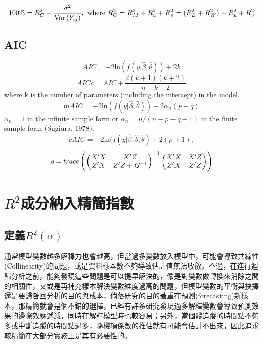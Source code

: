 \begin{equation}\label{eq:r2.composition}
100\%=R_C^2+\frac{\sigma^2}{\text{Var\,}(Y_{ij})}, \text{ where } R_C^2=R_M^2+R_u^2+R_v^2=(R_B^2+R_W^2)+R_u^2+R_v^2
\end{equation}

\subsection{AIC}
\begin{equation}\label{eq:AIC}
AIC = −2\text{ln}(f(y|\hat\beta, \hat\theta))+2k
\end{equation}
\begin{equation}\label{eq:AICc}
AICc = AIC + \frac{2(k+1)(k+2)}{n−k−2}
\end{equation}
where k is the number of parameters (including the intercept) in the model.
\begin{equation}\label{eq:mAIC}
mAIC = −2\text{ln}(f(y|\hat\beta, \hat\theta)) + 2\alpha_n(p+q)
\end{equation}
$\alpha_n = 1$ in the infinite sample form or $\alpha_n = n/(n−p−q−1)$ in the finite sample form (Sugiura, 1978).
\begin{equation}\label{eq:cAIC}
cAIC = −2\text{ln}(f(y|\hat\beta, \hat b, \hat\theta) + 2(\rho + 1),
\end{equation}
\[\rho=trace\left(\begin{pmatrix}X'X&X'Z\\Z'X&Z'Z+G^{-1}\end{pmatrix}^{-1}
\begin{pmatrix}X'X&X'Z\\Z'X&Z'Z\end{pmatrix}\right)\]




\newpage 
\section{$R^2$成分納入精簡指數}
\subsection{定義$R^2(\alpha)$}
通常模型變數越多解釋力也會越高，但當過多變數放入模型中，可能會導致共線性(Collinearity)的問題，或是資料樣本數不夠導致估計值無法收斂。不過，在進行迴歸分析之前，能夠發現這些問題是可以提早解決的，像是對變數做轉換來消除之間的相關性，又或是再補充樣本解決變數維度過高的問題，但模型變數的平衡與抉擇還是要歸咎回分析的目的與成本，倘落研究的目的著重在預測(forecasting)新樣本，那精簡就會是個不錯的選擇，已經有許多研究發現過多解釋變數會導致預測效果的邊際效應遞減，同時在解釋模型時也較容易；另外，當個體追蹤的時間點不夠多或中斷追蹤的時間點過多，隨機項係數的推估就有可能會估計不出來，因此追求較精簡在大部分實務上是其有必要性的。

